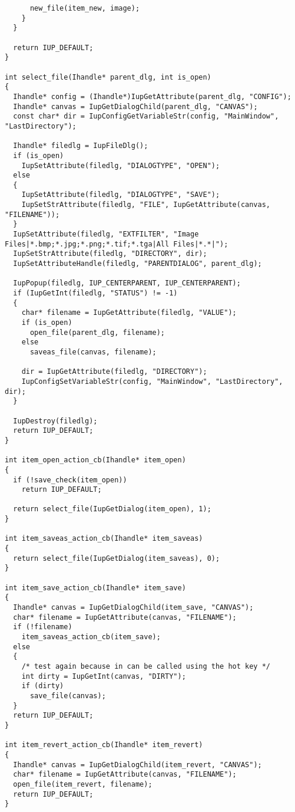 \documentclass{ctexart}
\begin{document}
\begin{lstlisting}
      new_file(item_new, image);
    }
  }

  return IUP_DEFAULT;
}

int select_file(Ihandle* parent_dlg, int is_open)
{
  Ihandle* config = (Ihandle*)IupGetAttribute(parent_dlg, "CONFIG");
  Ihandle* canvas = IupGetDialogChild(parent_dlg, "CANVAS");
  const char* dir = IupConfigGetVariableStr(config, "MainWindow", "LastDirectory");

  Ihandle* filedlg = IupFileDlg();
  if (is_open)
    IupSetAttribute(filedlg, "DIALOGTYPE", "OPEN");
  else
  {
    IupSetAttribute(filedlg, "DIALOGTYPE", "SAVE");
    IupSetStrAttribute(filedlg, "FILE", IupGetAttribute(canvas, "FILENAME"));
  }
  IupSetAttribute(filedlg, "EXTFILTER", "Image Files|*.bmp;*.jpg;*.png;*.tif;*.tga|All Files|*.*|");
  IupSetStrAttribute(filedlg, "DIRECTORY", dir);
  IupSetAttributeHandle(filedlg, "PARENTDIALOG", parent_dlg);

  IupPopup(filedlg, IUP_CENTERPARENT, IUP_CENTERPARENT);
  if (IupGetInt(filedlg, "STATUS") != -1)
  {
    char* filename = IupGetAttribute(filedlg, "VALUE");
    if (is_open)
      open_file(parent_dlg, filename);
    else
      saveas_file(canvas, filename);

    dir = IupGetAttribute(filedlg, "DIRECTORY");
    IupConfigSetVariableStr(config, "MainWindow", "LastDirectory", dir);
  }

  IupDestroy(filedlg);
  return IUP_DEFAULT;
}

int item_open_action_cb(Ihandle* item_open)
{
  if (!save_check(item_open))
    return IUP_DEFAULT;

  return select_file(IupGetDialog(item_open), 1);
}

int item_saveas_action_cb(Ihandle* item_saveas)
{
  return select_file(IupGetDialog(item_saveas), 0);
}

int item_save_action_cb(Ihandle* item_save)
{
  Ihandle* canvas = IupGetDialogChild(item_save, "CANVAS");
  char* filename = IupGetAttribute(canvas, "FILENAME");
  if (!filename)
    item_saveas_action_cb(item_save);
  else   
  {
    /* test again because in can be called using the hot key */
    int dirty = IupGetInt(canvas, "DIRTY");
    if (dirty)
      save_file(canvas);
  }
  return IUP_DEFAULT;
}

int item_revert_action_cb(Ihandle* item_revert)
{
  Ihandle* canvas = IupGetDialogChild(item_revert, "CANVAS");
  char* filename = IupGetAttribute(canvas, "FILENAME");
  open_file(item_revert, filename);
  return IUP_DEFAULT;
}


\end{lstlisting}
\end{document}
